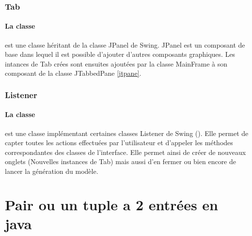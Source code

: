 \subsubsection{Tab}

\paragraph{La classe  } est une classe héritant de la classe JPanel de Swing. JPanel est un composant de base dans lequel il est possible d'ajouter d'autres composants graphiques. Les intances de Tab crées sont ensuites ajoutées par la classe MainFrame à son composant de la classe JTabbedPane \ref{jtpane}.

\subsubsection{Listener}

\paragraph{La classe } est une classe implémentant certaines classes Listener de Swing (). Elle permet de capter toutes les actions effectuées par l'utilisateur et d'appeler les méthodes correspondantes des classes de l'interface. Elle permet ainsi de créer de nouveaux onglets (Nouvelles instances de Tab) mais aussi d'en fermer ou bien encore de lancer la génération du modèle.
\section{Pair ou un tuple a 2 entrées en java}